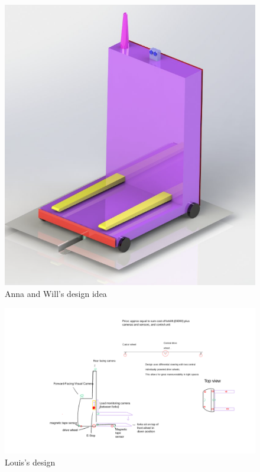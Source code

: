 \documentclass[12pt]{article}
\begin{document}
\begin{enumerate}
\begin{figure}[h!]
\begin{minipage}{0.48\textwidth}
        \includegraphics[width=\textwidth]{anna&will's design.png}
        \caption{Anna and Will's design idea}
        \label{fig:design_idea}
    \end{minipage}
\end{figure}

\begin{figure}[h!]
    \centering
    \begin{minipage}{0.48\textwidth}

        \includegraphics[width=1\textwidth]{Louis's design.png}
        \caption{Louis's design}
        \label{fig:louis_design}
    \end{minipage}
    \hfill
    \begin{minipage}{0.48\textwidth}
      

\end{minipage}
\end{figure}
\end{enumerate}
\end{document}
